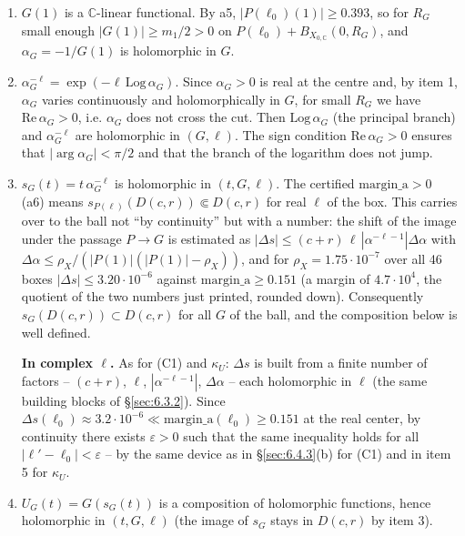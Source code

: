 \begin{enumerate}
\item[1.] \textbf{$G(1)$} is a $\mathbb C$-linear functional. By a5,
   $|P(\ell_0)(1)|\ge0.393$, so for $R_G$ small enough
   $|G(1)|\ge m_1/2>0$ on $P(\ell_0)+B_{X_{0,\mathbb C}}(0,R_G)$, and
   $\alpha_G=-1/G(1)$ is holomorphic in $G$.

\item[2.] \textbf{$\alpha_G^{-\ell}=\exp(-\ell\,\mathrm{Log}\,\alpha_G)$}.
   Since $\alpha_G>0$ is real at the centre and, by item 1, $\alpha_G$ varies
   continuously and holomorphically in $G$, for small $R_G$ we have
   $\mathrm{Re}\,\alpha_G>0$, i.e. $\alpha_G$ does not cross the cut. Then
   $\mathrm{Log}\,\alpha_G$ (the principal branch) and $\alpha_G^{-\ell}$ are
   holomorphic in $(G,\ell)$. The sign condition $\mathrm{Re}\,\alpha_G>0$
   ensures that $|\arg\alpha_G|<\pi/2$ and that the branch of the logarithm does
   not jump.

\item[3.] \textbf{$s_G(t)=t\,\alpha_G^{-\ell}$} is holomorphic in $(t,G,\ell)$.
   The certified $\mathrm{margin\_a}>0$ (a6) means
   $s_{P(\ell)}(D(c,r))\Subset D(c,r)$ for real $\ell$ of the box. This
   carries over to the ball not ``by continuity'' but with a number: the shift of
   the image under the passage $P\to G$ is estimated as
   $|\Delta s|\le(c+r)\,\ell\,|\alpha^{-\ell-1}|\Delta\alpha$ with
   $\Delta\alpha\le\rho_X/(|P(1)|(|P(1)|-\rho_X))$, and for
   $\rho_X=1.75\cdot10^{-7}$ over all 46 boxes
   $|\Delta s|\le3.20\cdot10^{-6}$ against $\mathrm{margin\_a}\ge0.151$
   (a margin of $4.7\cdot10^{4}$, the quotient of the two numbers just printed,
   rounded down). Consequently $s_G(D(c,r))\subset D(c,r)$ for
   all $G$ of the ball, and the composition below is well defined.

   \textbf{In complex \boldmath$\ell$.} As for (C1) and $\kappa_U$: $\Delta s$ is built from a finite number of factors -- $(c+r)$, $\ell$, $|\alpha^{-\ell-1}|$, $\Delta\alpha$ -- each holomorphic in $\ell$ (the same building blocks of \S\ref{sec:6.3.2}). Since $\Delta s(\ell_0)\approx3.2\cdot10^{-6}\ll \mathrm{margin\_a}(\ell_0)\ge0.151$ at the real center, by continuity there exists $\varepsilon>0$ such that the same inequality holds for all $|\ell'-\ell_0|<\varepsilon$ -- by the same device as in \S\ref{sec:6.4.3}(b) for (C1) and in item 5 for $\kappa_U$.

\item[4.] \textbf{$U_G(t)=G(s_G(t))$} is a composition of holomorphic functions, hence holomorphic in $(t,G,\ell)$ (the image of $s_G$ stays in $D(c,r)$ by item 3).


\end{enumerate}
